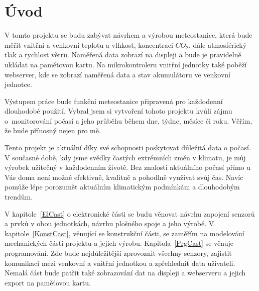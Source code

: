\cleardoublepage
\chapter*{Úvod}

    V tomto projektu se budu zabývat návrhem a výrobou meteostanice, která bude měřit vnitřní a venkovní teplotu a vlhkost, koncentraci $CO_2$, dále atmosférický tlak a rychlost větru. Naměřená data zobrazí na displeji a bude je pravidelně ukládat na paměťovou kartu. Na mikrokontroleru vnitřní jednotky také poběží webserver, kde se zobrazí naměřená data a stav akumulátoru ve venkovní jednotce.
    
    Výstupem práce bude funkční meteostanice připravená pro každodenní dlouhodobé použití. Vybral jsem si vytvoření tohoto projektu kvůli zájmu o~monitorování počasí a jeho průběhu během dne, týdne, měsíce či roku. Věřím, že bude přínosný nejen pro mě.
    
    Tento projekt je aktuální díky své schopnosti poskytovat důležitá data o počasí. V současné době, kdy jsme svědky častých extrémních změn v klimatu, je můj výrobek užitečný v každodenním životě. Bez znalosti aktuálního počasí přímo u Vás doma není možné efektivně, kvalitně a pohodlně využívat svůj čas. Navíc pomůže lépe porozumět aktuálním klimatickým podmínkám a dlouhodobým trendům.
    
    V kapitole~\ref{ElCast} o elektronické části se budu věnovat návrhu zapojení senzorů a prvků v obou jednotkách, návrhu plošného spoje a jeho výrobě. V kapitole~\ref{KonstCast}, věnující se konstrukční části, se zaměřím na modelování mechanických částí projektu a jejich výrobu. Kapitola~\ref{PrgCast} se věnuje programování. Zde bude nejdůležitější zprovoznit všechny senzory, zajistit komunikaci mezi venkovní a vnitřní jednotkou a zpřehlednit data uživateli. Nemalá část bude patřit také zobrazování dat na displeji a webserveru a jejich export na paměťovou kartu.